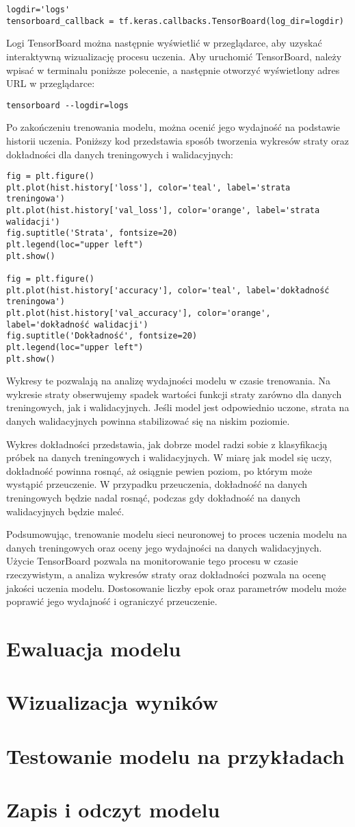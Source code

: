 \begin{verbatim}
logdir='logs'
tensorboard_callback = tf.keras.callbacks.TensorBoard(log_dir=logdir)
\end{verbatim}

Logi TensorBoard można następnie wyświetlić w przeglądarce, aby uzyskać interaktywną wizualizację procesu uczenia. Aby uruchomić TensorBoard, należy wpisać w terminalu poniższe polecenie, a następnie otworzyć wyświetlony adres URL w przeglądarce:

\begin{verbatim}
tensorboard --logdir=logs
\end{verbatim}

Po zakończeniu trenowania modelu, można ocenić jego wydajność na podstawie historii uczenia. Poniższy kod przedstawia sposób tworzenia wykresów straty oraz dokładności dla danych treningowych i walidacyjnych:

\begin{verbatim}
fig = plt.figure()
plt.plot(hist.history['loss'], color='teal', label='strata treningowa')
plt.plot(hist.history['val_loss'], color='orange', label='strata walidacji')
fig.suptitle('Strata', fontsize=20)
plt.legend(loc="upper left")
plt.show()

fig = plt.figure()
plt.plot(hist.history['accuracy'], color='teal', label='dokładność treningowa')
plt.plot(hist.history['val_accuracy'], color='orange', label='dokładność walidacji')
fig.suptitle('Dokładność', fontsize=20)
plt.legend(loc="upper left")
plt.show()
\end{verbatim}

Wykresy te pozwalają na analizę wydajności modelu w czasie trenowania. Na wykresie straty obserwujemy spadek wartości funkcji straty zarówno dla danych treningowych, jak i walidacyjnych. Jeśli model jest odpowiednio uczone, strata na danych walidacyjnych powinna stabilizować się na niskim poziomie.

Wykres dokładności przedstawia, jak dobrze model radzi sobie z klasyfikacją próbek na danych treningowych i walidacyjnych. W miarę jak model się uczy, dokładność powinna rosnąć, aż osiągnie pewien poziom, po którym może wystąpić przeuczenie. W przypadku przeuczenia, dokładność na danych treningowych będzie nadal rosnąć, podczas gdy dokładność na danych walidacyjnych będzie maleć.

Podsumowując, trenowanie modelu sieci neuronowej to proces uczenia modelu na danych treningowych oraz oceny jego wydajności na danych walidacyjnych. Użycie TensorBoard pozwala na monitorowanie tego procesu w czasie rzeczywistym, a analiza wykresów straty oraz dokładności pozwala na ocenę jakości uczenia modelu. Dostosowanie liczby epok oraz parametrów modelu może poprawić jego wydajność i ograniczyć przeuczenie.

\section{Ewaluacja modelu}
\section{Wizualizacja wyników}
\section{Testowanie modelu na przykładach}
\section{Zapis i odczyt modelu}